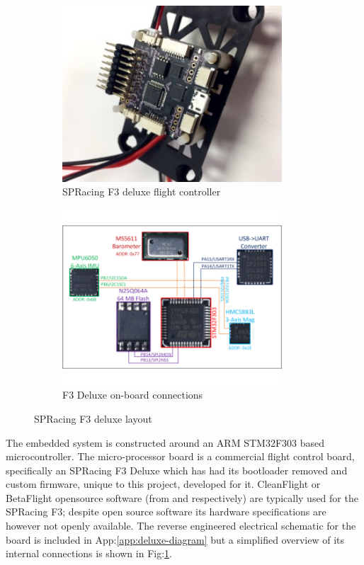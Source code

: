 \par
\begin{figure}[htbp]
\begin{subfigure}{0.5\textwidth}
\centering
\includegraphics[width=0.9\textwidth]{figs/f3-deluxe}
\caption{SPRacing F3 deluxe flight controller}
\end{subfigure}
\begin{subfigure}{0.5\textwidth}
\centering
\includegraphics[width=0.9\textwidth]{figs/f3-deluxe-board}
\caption{F3 Deluxe on-board connections}
\label{fig:f3-deluxe-board}
\end{subfigure}
\caption{SPRacing F3 deluxe layout}
\label{fig:f3-deluxe-layout}
\vspace{-10pt}
\end{figure}
The embedded system is constructed around an ARM STM32F303\cite{stm32f303} based microcontroller. The micro-processor board is a commercial flight control board, specifically an SPRacing F3 Deluxe\cite{spracing} which has had its bootloader removed and custom firmware, unique to this project, developed for it. CleanFlight or BetaFlight opensource software (from \cite{cleanflight} and \cite{betaflight} respectively) are typically used for the SPRacing F3; despite open source software its hardware specifications are  however not openly available. The reverse engineered electrical schematic for the board is included in App:\ref{app:deluxe-diagram} but a simplified overview of its internal connections is shown in Fig:\ref{fig:f3-deluxe-board}.
